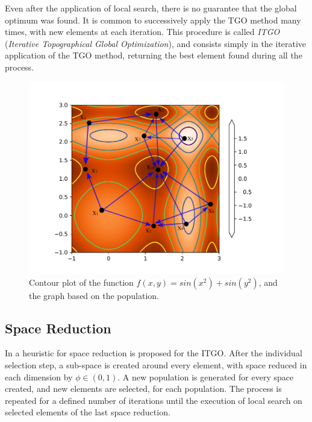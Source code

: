 Even after the application of local search, there is no guarantee that the global optimum was found. It is common to successively apply the TGO method many times, with new elements at each iteration. This procedure is called \textit{ITGO} (\textit{Iterative Topographical Global Optimization}), and consists simply in the iterative application of the TGO method, returning the best element found during all the process.



\begin{figure}[tp]
\begin{center}
\includegraphics[scale=0.6]{fig_1.pdf}
\end{center}
\captionsetup{justification=centering}
\vspace*{-7mm} 
\caption{Contour plot of the function $f(x, y) = sin(x^2) + sin(y^2)$, and the graph based on the population.}\label{fig:Graph}
\end{figure}


\subsection{Space Reduction}

In \cite{ITGO4} a heuristic for space reduction is proposed for the ITGO. After the individual selection step, a sub-space is created around every element, with space reduced in each dimension by $\phi \in (0, 1)$. A new population is generated for every space created, and new elements are selected, for each population. The process is repeated for a defined number of iterations until the execution of local search on selected elements of the last space reduction.

